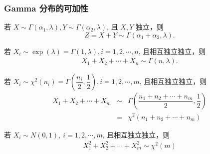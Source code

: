 \documentclass[Prob-All.tex]{subfiles}
\begin{document}
 \begin{frame}
 	\frametitle{Gamma 分布的可加性}
 	\begin{exam}
 		若 $X\sim \Gamma (\alpha_1,\lambda), Y\sim \Gamma (\alpha_2,\lambda)$, 且 $X,Y$ 独立，则 $$Z=X+Y\sim \Gamma (\alpha_1+\alpha_2,\lambda).$$
 	\end{exam}

 	\pause \begin{exam}
 		若 $X_i\sim \exp (\lambda)=\Gamma (1,\lambda), i=1,2,\cdots,n$, 且相互独立独立，则
 		\begin{eqnarray*}
 			X_1+X_2+\cdots+X_n\sim \Gamma(n,\lambda).
 		\end{eqnarray*}
 	\end{exam}

 	\pause
 	\begin{exam}
 		若 $X_i\sim \chi^2 (n_i)=\Gamma (\dfrac{n_i}{2},\dfrac{1}{2}), i=1,2,\cdots,m$, 且相互独立独立，则
 		\begin{eqnarray*}
 			X_1+X_2+\cdots+X_m&\sim& \Gamma(\dfrac{n_1+n_2+\cdots+n_m}{2},\dfrac{1}{2})\\
 			&=& \chi^2(n_1+n_2+\cdots+n_m)  \end{eqnarray*}

 	\end{exam}

\pause
\begin{exam}
 		若 $X_i\sim N(0,1), \  i=1,2,\cdots,m$, 且相互独立独立，则
 		\begin{eqnarray*}
 			X_1^2+X_2^2+\cdots+X_m^2 \sim \chi^2(m) \end{eqnarray*}

 	\end{exam}

 \end{frame}
\end{document}

